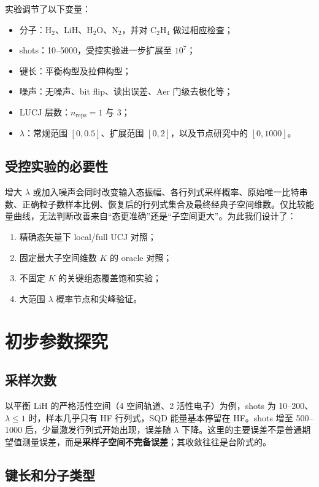 \documentclass[UTF8,12pt,a4paper]{ctexart}
\begin{document}
实验调节了以下变量：
\begin{itemize}
  \item 分子：H$_2$、LiH、H$_2$O、N$_2$，并对 C$_2$H$_4$ 做过相应检查；
  \item shots：10--5000，受控实验进一步扩展至 $10^7$；
  \item 键长：平衡构型及拉伸构型；
  \item 噪声：无噪声、bit flip、读出误差、Aer 门级去极化等；
  \item LUCJ 层数：$n_{\mathrm{reps}}=1$ 与 3；
  \item $\lambda$：常规范围 $[0,0.5]$、扩展范围 $[0,2]$，以及节点研究中的 $[0,1000]$。
\end{itemize}

\subsection{受控实验的必要性}

增大 $\lambda$ 或加入噪声会同时改变输入态振幅、各行列式采样概率、原始唯一比特串数、正确粒子数样本比例、恢复后的行列式集合及最终经典子空间维数。仅比较能量曲线，无法判断改善来自“态更准确”还是“子空间更大”。为此我们设计了：
\begin{enumerate}
  \item 精确态矢量下 local/full UCJ 对照；
  \item 固定最大子空间维数 $K$ 的 oracle 对照；
  \item 不固定 $K$ 的关键组态覆盖饱和实验；
  \item 大范围 $\lambda$ 概率节点和尖峰验证。
\end{enumerate}

\section{初步参数探究}

\subsection{采样次数}

以平衡 LiH 的严格活性空间（4 空间轨道、2 活性电子）为例，shots 为 10--200、$\lambda\le1$ 时，样本几乎只有 HF 行列式，SQD 能量基本停留在 HF。shots 增至 500--1000 后，少量激发行列式开始出现，误差随 $\lambda$ 下降。这里的主要误差不是普通期望值测量误差，而是\textbf{采样子空间不完备误差}；其收敛往往是台阶式的。

\subsection{键长和分子类型}
\end{document}
